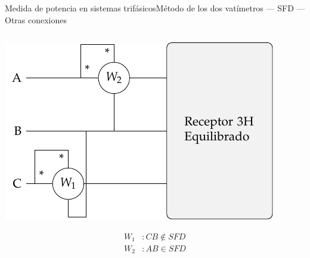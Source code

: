 \documentclass[aspectratio=169, xcolor={usenames,svgnames,dvipsnames}]{beamer}
\begin{document}
\begin{frame}{Medida de potencia en sistemas trifásicos}{Método de los dos vatímetros --- SFD --- Otras conexiones}
\begin{columns}
\begin{column}{0.33\columnwidth}
\begin{center}
\includegraphics[width=.8\linewidth]{../figs/Potencia_3H_equilibrado_CA.pdf}
\end{center}
\begin{align*}
  W_1&: CB \notin SFD\\
  W_2&: AB \in SFD
\end{align*}
\end{column}
\end{columns}
\end{frame}
\end{document}
